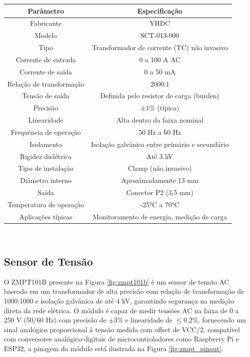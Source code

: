 \begin{quadro}[htbp]
    \centering
    \caption{Especificações técnicas do sensor de corrente SCT-013-000}
    \begin{tabular}{|c|c|}
    \hline
    \textbf{Parâmetro} & \textbf{Especificação} \\ \hline
    Fabricante & YHDC \\ \hline
    Modelo & SCT-013-000 \\ \hline
    Tipo & Transformador de corrente (TC) não invasivo \\ \hline
    Corrente de entrada & 0 a 100 A AC \\ \hline
    Corrente de saída & 0 a 50 mA \\ \hline
    Relação de transformação & 2000:1 \\ \hline
    Tensão de saída & Definida pelo resistor de carga (burden) \\ \hline
    Precisão & ±1\% (típica) \\ \hline
    Linearidade & Alta dentro da faixa nominal \\ \hline
    Frequência de operação & 50 Hz a 60 Hz \\ \hline
    Isolamento & Isolação galvânica entre primário e secundário \\ \hline
    Rigidez dielétrica & Até 3 kV \\ \hline
    Tipo de instalação & Clamp (não invasivo) \\ \hline
    Diâmetro interno & Aproximadamente 13 mm \\ \hline
    Saída & Conector P2 (3,5 mm) \\ \hline
    Temperatura de operação & -25°C a 70°C \\ \hline
    Aplicações típicas & Monitoramento de energia, medição de carga \\ \hline
    \end{tabular}\\
    \label{quadro:esp_SCT013}
\end{quadro}

\subsection{Sensor de Tensão}
O ZMPT101B presente na Figura \ref{fig:zmpt101b} é um sensor de tensão AC baseado em um transformador de alta precisão com relação de transformação de 1000:1000 e isolação galvânica de até 4 kV, garantindo segurança na medição direta da rede elétrica. O módulo é capaz de medir tensões AC na faixa de 0 a 250 V (50/60 Hz) com precisão de $\pm$3\% e linearidade de $\leq$0,2\%, fornecendo um sinal analógico proporcional à tensão medida com offset de VCC/2, compatível com conversores analógico-digitais de microcontroladores como Raspberry Pi e ESP32, a pinagem do módulo está ilustrada na Figura \ref{fig:zmpt_pinout}.

